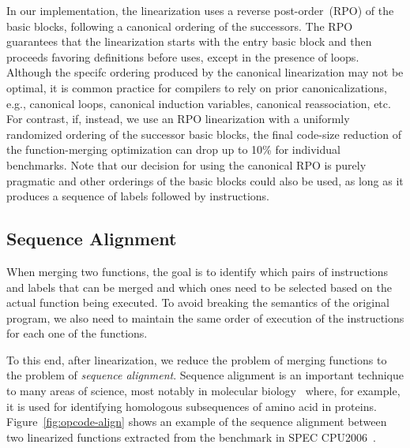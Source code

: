 In our implementation, the linearization uses a reverse post-order~(RPO) of the
basic blocks, following a canonical ordering of the successors.
The RPO guarantees that the linearization starts with the entry basic block and
then proceeds favoring definitions before uses, except in the presence of loops.
Although the specifc ordering produced by the canonical linearization may not
be optimal, it is common practice for compilers to rely on prior
canonicalizations, e.g., 
canonical loops, canonical induction variables, canonical reassociation, etc.
For contrast, if, instead, we use an RPO linearization with a uniformly
randomized ordering of the successor basic blocks, the final code-size reduction
of the function-merging optimization can drop up to 10\% for individual
benchmarks.
Note that our decision for using the canonical RPO is purely pragmatic and
other orderings of the basic blocks could also be used, as long as it produces
a sequence of labels followed by instructions.


\subsection{Sequence Alignment}

When merging two functions, the goal is to identify which pairs of instructions
and labels that can be merged and which ones need to be selected based on the
actual function being executed.
To avoid breaking the semantics of the original program, we also need to
maintain the same order of execution of the instructions for each one of
the functions.

To this end, after linearization, we reduce the problem of merging functions
to the problem of \textit{sequence alignment}. %
Sequence alignment is an important technique to many areas of science,
most notably in molecular biology~\cite{needleman70,smith81,carrillo88,wang94}
where, for example, it is used for identifying homologous subsequences of amino
acid in proteins.
Figure~\ref{fig:opcode-align} shows an example of the sequence alignment
between two linearized functions extracted from the  benchmark
in SPEC CPU2006~\cite{spec}.

